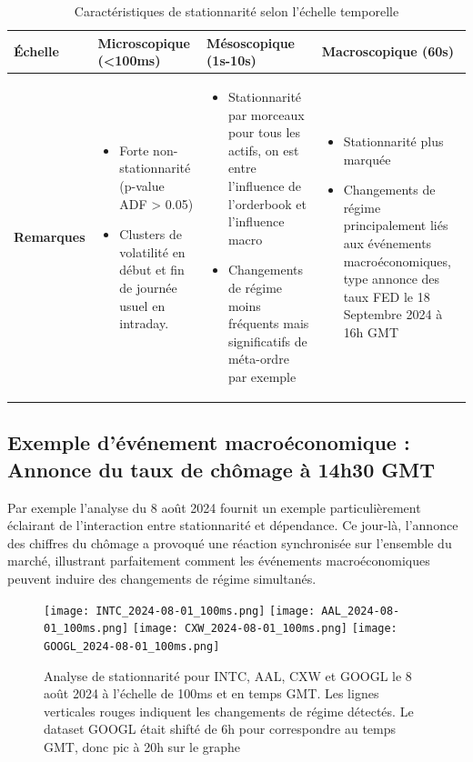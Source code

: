 \documentclass[10pt,a4paper]{article}
\theoremstyle{definition}
\theoremstyle{remark}
\begin{document}
\begin{table}[h!]
\centering
\begin{tabular}{|p{2.5cm}|p{4cm}|p{4cm}|p{4cm}|}
\hline
\textbf{Échelle} & \textbf{Microscopique} (<100ms) & \textbf{Mésoscopique} (1s-10s) & \textbf{Macroscopique} (60s) \\
\hline
\textbf{Remarques} & 
\begin{itemize}
    \item Forte non-stationnarité (p-value ADF > 0.05)
    \item Clusters de volatilité en début et fin de journée usuel en intraday.
\end{itemize} &
\begin{itemize}
    \item Stationnarité par morceaux pour tous les actifs, on est entre l'influence de l'orderbook et l'influence macro
    \item Changements de régime moins fréquents mais significatifs de méta-ordre par exemple
\end{itemize} &
\begin{itemize}
    \item Stationnarité plus marquée
    \item Changements de régime principalement liés aux événements macroéconomiques, type annonce des taux FED le 18 Septembre 2024 à 16h GMT
\end{itemize} \\
\hline
\end{tabular}
\caption{Caractéristiques de stationnarité selon l'échelle temporelle}
\label{tab:stationarity_results}
\end{table}

\subsection{Exemple d'événement macroéconomique : Annonce du taux de chômage à 14h30 GMT}

Par exemple l'analyse du 8 août 2024 fournit un exemple particulièrement éclairant de l'interaction entre stationnarité et dépendance. Ce jour-là, l'annonce des chiffres du chômage a provoqué une réaction synchronisée sur l'ensemble du marché, illustrant parfaitement comment les événements macroéconomiques peuvent induire des changements de régime simultanés.

\begin{figure}[h!]
\centering
        \texttt{[image: INTC\_2024-08-01\_100ms.png]}
        \texttt{[image: AAL\_2024-08-01\_100ms.png]}
        \texttt{[image: CXW\_2024-08-01\_100ms.png]}
        \texttt{[image: GOOGL\_2024-08-01\_100ms.png]}
    \caption{Analyse de stationnarité pour INTC, AAL, CXW et GOOGL le 8 août 2024 à l'échelle de 100ms et en temps GMT. Les lignes verticales rouges indiquent les changements de régime détectés.
    Le dataset GOOGL était shifté de 6h pour correspondre au temps GMT, donc pic à 20h sur le graphe}
    \label{fig:stationarity_unemployment}
\end{figure}
\end{document}
